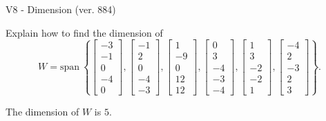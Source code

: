 \begin{exercise}
  \begin{exerciseTitle}V8 - Dimension (ver. 884)\end{exerciseTitle}
  \begin{exerciseStatement}
    Explain how to find the dimension of 
\[W=\mathrm{span}\ \left\{\left[\begin{array}{r}
-3 \\
-1 \\
0 \\
-4 \\
0
\end{array}\right] , \left[\begin{array}{r}
-1 \\
2 \\
0 \\
-4 \\
-3
\end{array}\right] , \left[\begin{array}{r}
1 \\
-9 \\
0 \\
12 \\
12
\end{array}\right] , \left[\begin{array}{r}
0 \\
3 \\
-4 \\
-3 \\
-4
\end{array}\right] , \left[\begin{array}{r}
1 \\
3 \\
-2 \\
-2 \\
1
\end{array}\right] , \left[\begin{array}{r}
-4 \\
2 \\
-3 \\
2 \\
3
\end{array}\right]\right\}.\]



  \end{exerciseStatement}
  \begin{exerciseAnswer}
   The dimension of \(W\) is  \(5\).
  


  \end{exerciseAnswer}
\end{exercise}